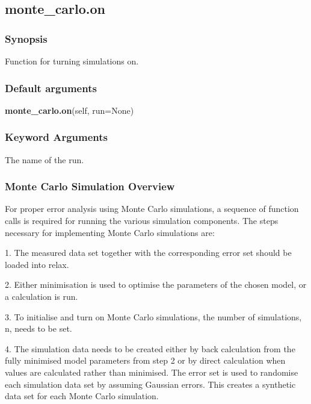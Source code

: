 



\newpage

\subsection{monte\_carlo.on}


\subsubsection{Synopsis}

Function for turning simulations on.

\subsubsection{Default arguments}

\textsf{\textbf{monte\_carlo.on}(self, run=None)}


\subsubsection{Keyword Arguments}

  The name of the run.

\subsubsection{Monte Carlo Simulation Overview}

For proper error analysis using Monte Carlo simulations, a sequence of function calls is
required for running the various simulation components.  The steps necessary for
implementing Monte Carlo simulations are:

1.  The measured data set together with the corresponding error set should be loaded into
relax.

2.  Either minimisation is used to optimise the parameters of the chosen model, or a
calculation is run.

3.  To initialise and turn on Monte Carlo simulations, the number of simulations, n, needs
to be set.

4.  The simulation data needs to be created either by back calculation from the fully
minimised model parameters from step 2 or by direct calculation when values are calculated
rather than minimised.  The error set is used to randomise each simulation data set by
assuming Gaussian errors.  This creates a synthetic data set for each Monte Carlo
simulation.

